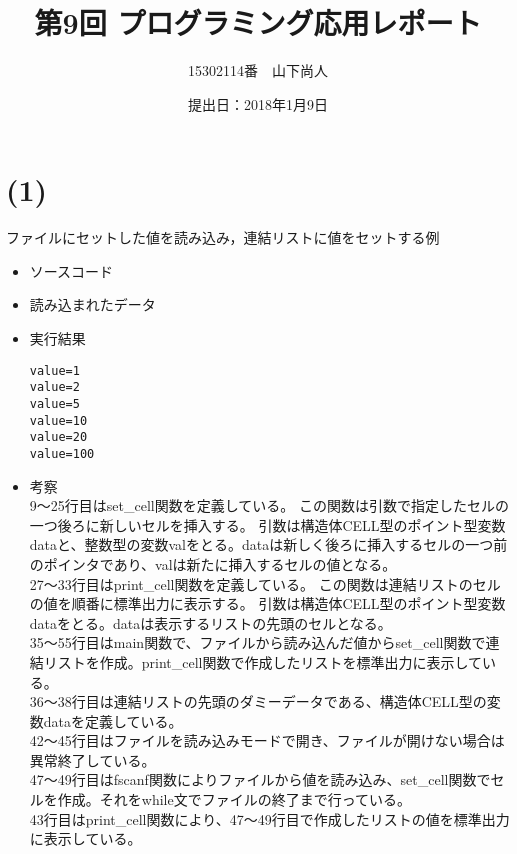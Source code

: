 \documentclass[a4paper]{jsarticle}
\title{第9回 プログラミング応用レポート}
\author{15302114番　山下尚人}
\date{提出日：2018年1月9日}
\begin{document}
\maketitle%

\section*{(1)}
	ファイルにセットした値を読み込み，連結リストに値をセットする例
	\begin{itemize}
	\item ソースコード
		 
		\mbox{}\newline
	\item 読み込まれたデータ
		 
		\mbox{}\newline
	\item 実行結果
		\begin{lstlisting}
value=1
value=2
value=5
value=10
value=20
value=100
		\end{lstlisting}
		\mbox{}\newline
	\item 考察\mbox{}\\
		9〜25行目はset\_cell関数を定義している。
		この関数は引数で指定したセルの一つ後ろに新しいセルを挿入する。
		引数は構造体CELL型のポイント型変数dataと、整数型の変数valをとる。dataは新しく後ろに挿入するセルの一つ前のポインタであり、valは新たに挿入するセルの値となる。\\
		
		27〜33行目はprint\_cell関数を定義している。
		この関数は連結リストのセルの値を順番に標準出力に表示する。
		引数は構造体CELL型のポイント型変数dataをとる。dataは表示するリストの先頭のセルとなる。\\
		
		35〜55行目はmain関数で、ファイルから読み込んだ値からset\_cell関数で連結リストを作成。print\_cell関数で作成したリストを標準出力に表示している。\\
		36〜38行目は連結リストの先頭のダミーデータである、構造体CELL型の変数dataを定義している。\\
		42〜45行目はファイルを読み込みモードで開き、ファイルが開けない場合は異常終了している。\\
		47〜49行目はfscanf関数によりファイルから値を読み込み、set\_cell関数でセルを作成。それをwhile文でファイルの終了まで行っている。\\
		43行目はprint\_cell関数により、47〜49行目で作成したリストの値を標準出力に表示している。\\ 
	\end{itemize}
	
\end{document}
